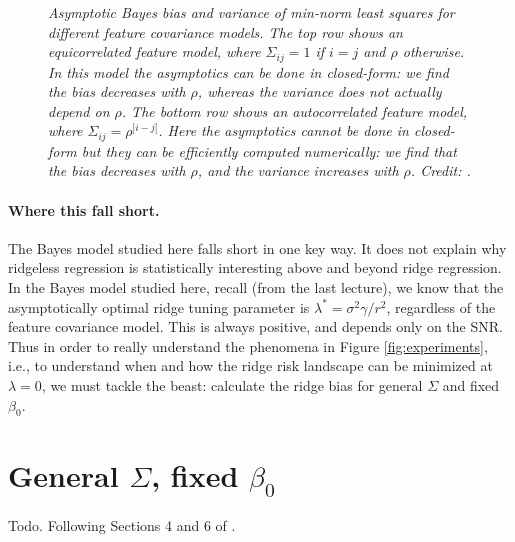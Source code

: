 \documentclass{article}
\begin{document}
\begin{figure}[p]
\caption{\it Asymptotic Bayes bias and variance of min-norm least squares for
  different feature covariance models. The top row shows an equicorrelated
  feature model, where $\Sigma_{ij} = 1$ if $i=j$ and $\rho$ otherwise. In this 
  model the asymptotics can be done in closed-form: we find the bias decreases
  with $\rho$, whereas the variance does not actually depend on $\rho$. The
  bottom row shows an autocorrelated feature model, where $\Sigma_{ij} = 
  \rho^{|i-j|}$. Here the asymptotics cannot be done in closed-form but they can  
  be efficiently computed numerically: we find that the bias decreases with
  $\rho$, and the variance increases with $\rho$. Credit:
  \citet{hastie2022surprises}.}      
\label{fig:risk_ec_ar}
\end{figure}

\paragraph{Where this fall short.}

The Bayes model studied here falls short in one key way. It does not explain why
ridgeless regression is statistically interesting above and beyond ridge
regression. In the Bayes model studied here, recall (from the last lecture), we
know that the asymptotically optimal ridge tuning parameter is $\lambda^* =
\sigma^2 \gamma / r^2$, regardless of the feature covariance model. This is
always positive, and depends only on the SNR. Thus in order to really understand
the phenomena in Figure \ref{fig:experiments}, i.e., to understand when and how
the ridge risk landscape can be minimized at $\lambda = 0$, we must tackle the
beast: calculate the ridge bias for general $\Sigma$ and fixed $\beta_0$.     

\section{General $\Sigma$, fixed $\beta_0$}

Todo. Following Sections 4 and 6 of \citet{hastie2022surprises}.



\end{document}
